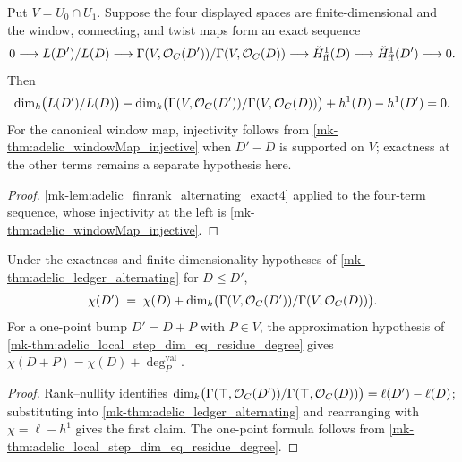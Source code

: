 \begin{theorem}
  \label{mk-thm:adelic_ledger_alternating}
  \leanok
  Put \(V=U_0\cap U_1\).  Suppose the four displayed spaces are
  finite-dimensional and the window, connecting, and twist maps form an
  exact sequence
  \[
    0\longrightarrow L(D')/L(D)
      \longrightarrow \Gamma(V,\mathcal{O}_{C}(D'))/\Gamma(V,\mathcal{O}_{C}(D))
      \longrightarrow\check H^1_{\mathrm{ff}}(D)
      \longrightarrow\check H^1_{\mathrm{ff}}(D')\longrightarrow0.
  \]
  Then
  \[
    \dim_k\bigl(L(D')/L(D)\bigr) - \dim_k\bigl(\Gamma(V,\mathcal{O}_{C}(D'))/
      \Gamma(V,\mathcal{O}_{C}(D))\bigr) + h^1(D) - h^1(D') = 0.
  \]
  For the canonical window map, injectivity follows from
  \ref{mk-thm:adelic_windowMap_injective} when \(D'-D\) is supported on
  \(V\); exactness at the other terms remains a separate hypothesis here.
\end{theorem}
\begin{proof}
  \leanok
  \ref{mk-lem:adelic_finrank_alternating_exact4} applied to the four-term
  sequence, whose injectivity at the left is
  \ref{mk-thm:adelic_windowMap_injective}.
\end{proof}

\begin{theorem}
  \label{mk-thm:adelic_chi_additivity}
  \leanok
  Under the exactness and finite-dimensionality hypotheses of
  \ref{mk-thm:adelic_ledger_alternating} for \(D\le D'\),
  \[
    \chi(D') \;=\; \chi(D) + \dim_k\bigl(\Gamma(V,\mathcal{O}_{C}(D'))/
      \Gamma(V,\mathcal{O}_{C}(D))\bigr).
  \]
  For a one-point bump \(D'=D+P\) with \(P\in V\), the approximation hypothesis of
  \ref{mk-thm:adelic_local_step_dim_eq_residue_degree} gives
  \(\chi(D+P)=\chi(D)+\deg_P^{\mathrm{val}}\).
\end{theorem}
\begin{proof}
  \leanok
  Rank--nullity identifies
  \(\dim_k\bigl(\Gamma(\top,\mathcal{O}_{C}(D'))/\Gamma(\top,\mathcal{O}_{C}(D))\bigr)
  = \ell(D') - \ell(D)\); substituting into
  \ref{mk-thm:adelic_ledger_alternating} and rearranging with
  \(\chi = \ell - h^1\) gives the first claim.  The one-point formula
  follows from \ref{mk-thm:adelic_local_step_dim_eq_residue_degree}.
\end{proof}

